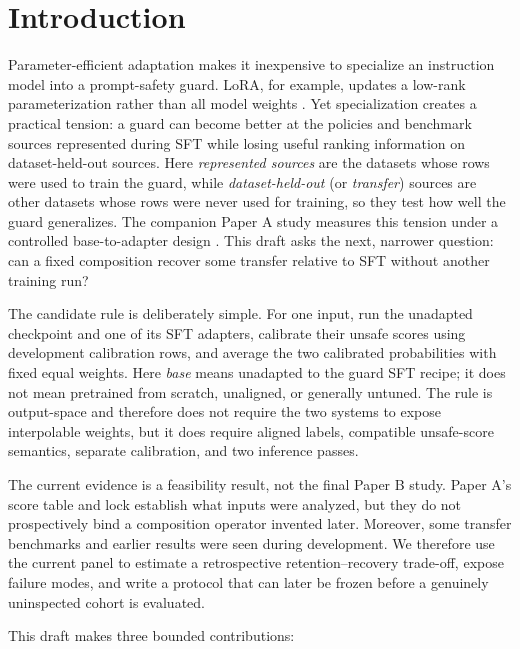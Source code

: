 \documentclass[11pt]{article}
\begin{document}
\section{Introduction}
\label{sec:introduction}

Parameter-efficient adaptation makes it inexpensive to specialize an instruction model into a
prompt-safety guard.  LoRA, for example, updates a low-rank parameterization rather than all model
weights \citep{hu2021lora}.  Yet specialization creates a practical tension: a guard can become
better at the policies and benchmark sources represented during SFT while losing useful ranking
information on dataset-held-out sources. Here \emph{represented sources} are the datasets whose rows were used to train the guard, while \emph{dataset-held-out} (or \emph{transfer}) sources are other datasets whose rows were never used for training, so they test how well the guard generalizes.  The companion Paper A study measures this tension under
a controlled base-to-adapter design \citep{rahimi2026benchmark}.  This draft asks the next, narrower
question: can a fixed composition recover some transfer relative to SFT without another training
run?

The candidate rule is deliberately simple.  For one input, run the unadapted checkpoint and one
of its SFT adapters, calibrate their unsafe scores using development calibration rows, and average
the two calibrated probabilities with fixed equal weights.  Here \emph{base} means unadapted to
the guard SFT recipe; it does not mean pretrained from scratch, unaligned, or generally untuned.
The rule is output-space and therefore does not require the two systems to expose interpolable
weights, but it does require aligned labels, compatible unsafe-score semantics, separate
calibration, and two inference passes.

The current evidence is a feasibility result, not the final Paper B study.  Paper A's score table
and lock establish what inputs were analyzed, but they do not prospectively bind a composition
operator invented later.  Moreover, some transfer benchmarks and earlier results were seen during
development.  We therefore use the current panel to estimate a retrospective retention--recovery
trade-off, expose failure modes, and write a protocol that can later be frozen before a genuinely
uninspected cohort is evaluated.

This draft makes three bounded contributions:
\end{document}
